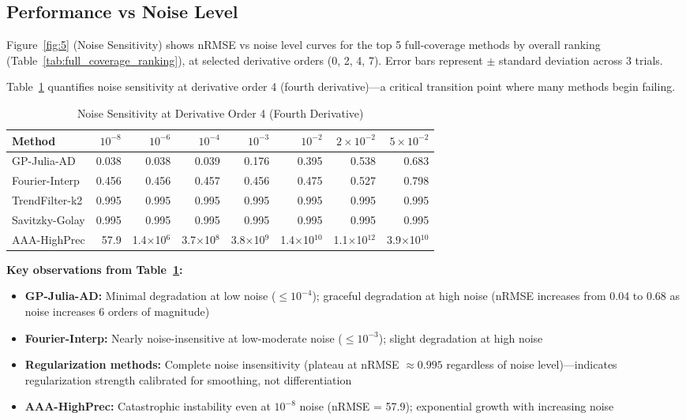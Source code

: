 \subsection{Performance vs Noise Level}
\label{sec:noise_sensitivity}

Figure~\ref{fig:5} (Noise Sensitivity) shows nRMSE vs noise level curves for the top 5 full-coverage methods by overall ranking (Table~\ref{tab:full_coverage_ranking}), at selected derivative orders (0, 2, 4, 7). Error bars represent $\pm$ standard deviation across 3 trials.

Table~\ref{tab:noise_sensitivity_order4} quantifies noise sensitivity at derivative order 4 (fourth derivative)—a critical transition point where many methods begin failing.

\begin{table}[htbp]
\centering
\caption{Noise Sensitivity at Derivative Order 4 (Fourth Derivative)}
\label{tab:noise_sensitivity_order4}
\small
\begin{tabular}{lrrrrrrr}
\toprule
\textbf{Method} & \textbf{$10^{-8}$} & \textbf{$10^{-6}$} & \textbf{$10^{-4}$} & \textbf{$10^{-3}$} & \textbf{$10^{-2}$} & \textbf{$2\times10^{-2}$} & \textbf{$5\times10^{-2}$} \\
\midrule
GP-Julia-AD & 0.038 & 0.038 & 0.039 & 0.176 & 0.395 & 0.538 & 0.683 \\
Fourier-Interp & 0.456 & 0.456 & 0.457 & 0.456 & 0.475 & 0.527 & 0.798 \\
TrendFilter-k2 & 0.995 & 0.995 & 0.995 & 0.995 & 0.995 & 0.995 & 0.995 \\
Savitzky-Golay & 0.995 & 0.995 & 0.995 & 0.995 & 0.995 & 0.995 & 0.995 \\
AAA-HighPrec & 57.9 & 1.4$\times$10$^{6}$ & 3.7$\times$10$^{8}$ & 3.8$\times$10$^{9}$ & 1.4$\times$10$^{10}$ & 1.1$\times$10$^{12}$ & 3.9$\times$10$^{10}$ \\
\bottomrule
\end{tabular}
\end{table}

\textbf{Key observations from Table~\ref{tab:noise_sensitivity_order4}:}
\begin{itemize}
    \item \textbf{GP-Julia-AD:} Minimal degradation at low noise ($\leq 10^{-4}$); graceful degradation at high noise (nRMSE increases from 0.04 to 0.68 as noise increases 6 orders of magnitude)
    \item \textbf{Fourier-Interp:} Nearly noise-insensitive at low-moderate noise ($\leq 10^{-3}$); slight degradation at high noise
    \item \textbf{Regularization methods:} Complete noise insensitivity (plateau at nRMSE $\approx 0.995$ regardless of noise level)—indicates regularization strength calibrated for smoothing, not differentiation
    \item \textbf{AAA-HighPrec:} Catastrophic instability even at $10^{-8}$ noise (nRMSE = 57.9); exponential growth with increasing noise
\end{itemize}

